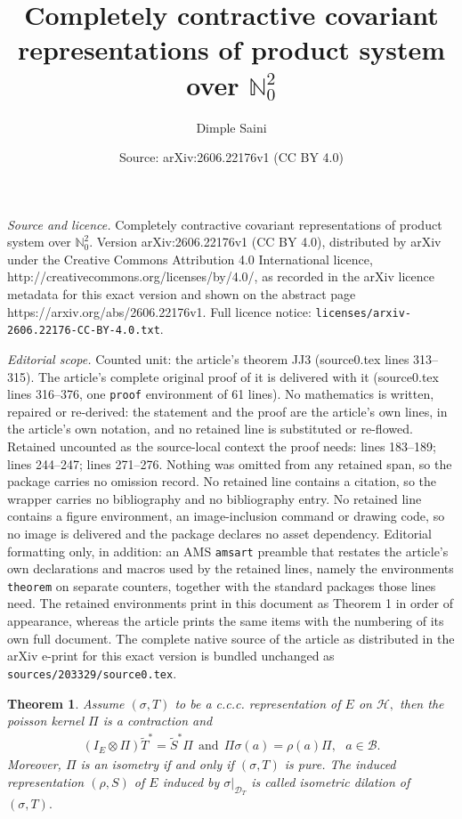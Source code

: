 \documentclass[10pt,a4paper]{amsart}
\title{Completely contractive covariant representations of product system over $\mathbb N^2_0$}
\author{Dimple Saini}
\date{Source: arXiv:2606.22176v1 (CC BY 4.0)}
\newtheorem{theorem}{Theorem}
\newcommand{\ot}{\otimes}
\begin{document}
\maketitle

\noindent\emph{Source and licence.} Completely contractive covariant representations of product system over $\mathbb N^2_0$. Version arXiv:2606.22176v1 (CC BY 4.0), distributed by arXiv under the Creative Commons Attribution 4.0 International licence, http://creativecommons.org/licenses/by/4.0/, as recorded in the arXiv licence metadata for this exact version and shown on the abstract page https://arxiv.org/abs/2606.22176v1. Full licence notice: \texttt{licenses/arxiv-2606.22176-CC-BY-4.0.txt}.\par\smallskip

\noindent\textit{Editorial scope.} Counted unit: the article's theorem JJ3 (source0.tex lines 313--315). The article's complete original proof of it is delivered with it (source0.tex lines 316--376, one \texttt{proof} environment of 61 lines). No mathematics is written, repaired or re-derived: the statement and the proof are the article's own lines, in the article's own notation, and no retained line is substituted or re-flowed.  Retained uncounted as the source-local context the proof needs: lines 183--189; lines 244--247; lines 271--276.  Nothing was omitted from any retained span, so the package carries no omission record.  No retained line contains a citation, so the wrapper carries no bibliography and no bibliography entry.  No retained line contains a figure environment, an image-inclusion command or drawing code, so no image is delivered and the package declares no asset dependency.  Editorial formatting only, in addition: an AMS \texttt{amsart} preamble that restates the article's own declarations and macros used by the retained lines, namely the environments \texttt{theorem} on separate counters, together with the standard packages those lines need.  The retained environments print in this document as Theorem 1 in order of appearance, whereas the article prints the same items with the numbering of its own full document.  The complete native source of the article as distributed in the arXiv e-print for this exact version is bundled unchanged as \texttt{sources/203329/source0.tex}.
\begin{theorem}\label{dilation}
		Assume $(\sigma, T)$ to be a c.c.c. representation of $E$ on $\mathcal{H},$ then the poisson kernel $\Pi$ is a contraction and
		\begin{align} \label{sid}
		  (I_{E} \ot \Pi)\widetilde{T}^{*}=\widetilde{S}^{*}\Pi  \:\: \mbox{and} \:\:  	\Pi \sigma(a)=\rho(a)\Pi, \:\:\:a \in \mathcal{B}. 
		\end{align}
		Moreover, $\Pi$ is an isometry if and only if $(\sigma, T) $ is pure. The induced representation $(\rho,S)$ of $E$ induced by $\sigma|_{\mathcal{D}_{T}}$ is called {\rm isometric dilation} of $(\sigma, T).$
\end{theorem}
\end{document}

